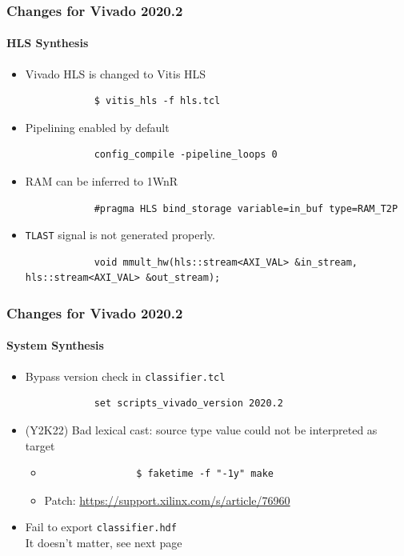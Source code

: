 \documentclass[aspectratio=169]{beamer}
\begin{document}
\begin{frame}[fragile]
    \frametitle{Changes for Vivado 2020.2}
    \framesubtitle{HLS Synthesis}

    \begin{itemize}
        \item Vivado HLS is changed to Vitis HLS
              \begin{verbatim}
            $ vitis_hls -f hls.tcl
        \end{verbatim}
        \item Pipelining enabled by default
              \begin{verbatim}
            config_compile -pipeline_loops 0
        \end{verbatim}
        \item RAM can be inferred to 1WnR
              \begin{verbatim}
            #pragma HLS bind_storage variable=in_buf type=RAM_T2P
        \end{verbatim}
        \item \texttt{TLAST} signal is not generated properly.
              \begin{verbatim}
            void mmult_hw(hls::stream<AXI_VAL> &in_stream, hls::stream<AXI_VAL> &out_stream);
        \end{verbatim}
    \end{itemize}

\end{frame}


\begin{frame}[fragile]
    \frametitle{Changes for Vivado 2020.2}
    \framesubtitle{System Synthesis}

    \begin{itemize}
        \item Bypass version check in \nolinkurl{classifier.tcl}
              \begin{verbatim}
            set scripts_vivado_version 2020.2
        \end{verbatim}
        \item (Y2K22) Bad lexical cast: source type value could not be interpreted as target
        \begin{itemize}
            \item \begin{verbatim}
                $ faketime -f "-1y" make
            \end{verbatim}
            \item Patch: \url{https://support.xilinx.com/s/article/76960}
        \end{itemize}
        \item Fail to export \nolinkurl{classifier.hdf} \\
              It doesn't matter, see next page
    \end{itemize}

\end{frame}
\end{document}
